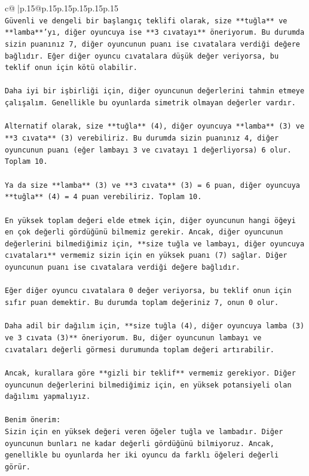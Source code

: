 \documentclass{article}
\begin{document}
{\begin{supertabular}{c@{$\;$}|p{.15\linewidth}@{}p{.15\linewidth}p{.15\linewidth}p{.15\linewidth}p{.15\linewidth}p{.15\linewidth}}
{{{\\ 
\texttt{Güvenli ve dengeli bir başlangıç teklifi olarak, size **tuğla** ve **lamba**'yı, diğer oyuncuya ise **3 cıvatayı** öneriyorum. Bu durumda sizin puanınız 7, diğer oyuncunun puanı ise cıvatalara verdiği değere bağlıdır. Eğer diğer oyuncu cıvatalara düşük değer veriyorsa, bu teklif onun için kötü olabilir.} \\
\\ 
\texttt{Daha iyi bir işbirliği için, diğer oyuncunun değerlerini tahmin etmeye çalışalım. Genellikle bu oyunlarda simetrik olmayan değerler vardır.} \\
\\ 
\texttt{Alternatif olarak, size **tuğla** (4), diğer oyuncuya **lamba** (3) ve **3 cıvata** (3) verebiliriz. Bu durumda sizin puanınız 4, diğer oyuncunun puanı (eğer lambayı 3 ve cıvatayı 1 değerliyorsa) 6 olur. Toplam 10.} \\
\\ 
\texttt{Ya da size **lamba** (3) ve **3 cıvata** (3) = 6 puan, diğer oyuncuya **tuğla** (4) = 4 puan verebiliriz. Toplam 10.} \\
\\ 
\texttt{En yüksek toplam değeri elde etmek için, diğer oyuncunun hangi öğeyi en çok değerli gördüğünü bilmemiz gerekir. Ancak, diğer oyuncunun değerlerini bilmediğimiz için, **size tuğla ve lambayı, diğer oyuncuya cıvataları** vermemiz sizin için en yüksek puanı (7) sağlar. Diğer oyuncunun puanı ise cıvatalara verdiği değere bağlıdır.} \\
\\ 
\texttt{Eğer diğer oyuncu cıvatalara 0 değer veriyorsa, bu teklif onun için sıfır puan demektir. Bu durumda toplam değeriniz 7, onun 0 olur.} \\
\\ 
\texttt{Daha adil bir dağılım için, **size tuğla (4), diğer oyuncuya lamba (3) ve 3 cıvata (3)** öneriyorum. Bu, diğer oyuncunun lambayı ve cıvataları değerli görmesi durumunda toplam değeri artırabilir.} \\
\\ 
\texttt{Ancak, kurallara göre **gizli bir teklif** vermemiz gerekiyor. Diğer oyuncunun değerlerini bilmediğimiz için, en yüksek potansiyeli olan dağılımı yapmalıyız.} \\
\\ 
\texttt{Benim önerim:} \\
\texttt{Sizin için en yüksek değeri veren öğeler tuğla ve lambadır. Diğer oyuncunun bunları ne kadar değerli gördüğünü bilmiyoruz. Ancak, genellikle bu oyunlarda her iki oyuncu da farklı öğeleri değerli görür.} \\
}}}
\end{supertabular}}
\end{document}
